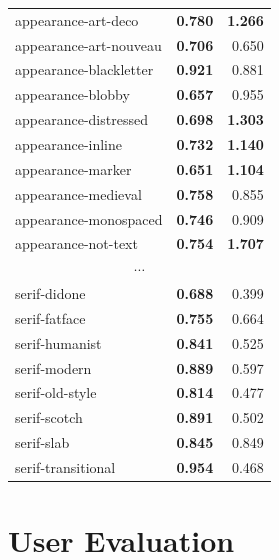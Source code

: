 \begin{longtable}{|l|r|r|}
appearance-art-deco       & \textbf{0.780}             & \textbf{1.266}          \\
appearance-art-nouveau    & \textbf{0.706}             & 0.650                   \\
appearance-blackletter    & \textbf{0.921}             & 0.881                   \\
appearance-blobby         & \textbf{0.657}             & 0.955                   \\
appearance-distressed     & \textbf{0.698}             & \textbf{1.303}          \\
appearance-inline         & \textbf{0.732}             & \textbf{1.140}          \\
appearance-marker         & \textbf{0.651}             & \textbf{1.104}          \\
appearance-medieval       & \textbf{0.758}             & 0.855                   \\
appearance-monospaced     & \textbf{0.746}             & 0.909                   \\
appearance-not-text       & \textbf{0.754}             & \textbf{1.707}          \\
\hline
\multicolumn{3}{|c|}{$\cdots$} \\
\hline
serif-didone            & \textbf{0.688}             & 0.399                   \\
serif-fatface              & \textbf{0.755}             & 0.664                   \\
serif-humanist            & \textbf{0.841}             & 0.525                   \\
serif-modern              & \textbf{0.889}             & 0.597                   \\
serif-old-style           & \textbf{0.814}             & 0.477                   \\
serif-scotch              & \textbf{0.891}             & 0.502                   \\
serif-slab                & \textbf{0.845}             & 0.849                   \\
serif-transitional        & \textbf{0.954}             & 0.468              

\end{longtable}

\section{User Evaluation} \label{user-eval}

